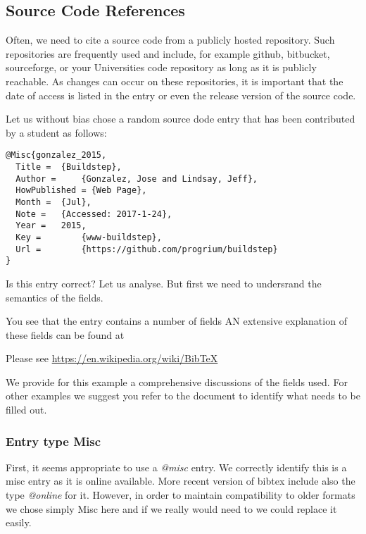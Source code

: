 \subsection{Source Code References}
\label{s:e:source-code-references}

Often, we need to cite a source code from a publicly hosted
repository. Such repositories are frequently used and include, for
example github, bitbucket, sourceforge, or your Universities code
repository as long as it is publicly reachable. As changes can occur on
these repositories, it is important that the date of access is listed in
the entry or even the release version of the source code.

Let us without bias chose a random source dode entry that has been
contributed by a student as follows:

\begin{verbatim}
@Misc{gonzalez_2015,
  Title =  {Buildstep},
  Author =     {Gonzalez, Jose and Lindsay, Jeff},
  HowPublished = {Web Page},
  Month =  {Jul},
  Note =   {Accessed: 2017-1-24},
  Year =   2015,
  Key =        {www-buildstep},
  Url =        {https://github.com/progrium/buildstep}
}
\end{verbatim}

Is this entry correct? Let us analyse. But first we need to undersrand
the semantics of the fields.


You see that the entry contains a number of fields AN extensive
explanation of these fields can be found at 

Please see \url{https://en.wikipedia.org/wiki/BibTeX}

We provide for this example a comprehensive discussions of the fields
used. For other examples we suggest you refer to the document to
identify what needs to be filled out.

\subsubsection{Entry type Misc}\label{s:e:entry-type-misc}

First, it seems appropriate to use a \emph{@misc} entry. We correctly
identify this is a misc entry as it is online available. More recent
version of bibtex include also the type \emph{@online} for it. However,
in order to maintain compatibility to older formats we chose simply Misc
here and if we really would need to we could replace it easily.

